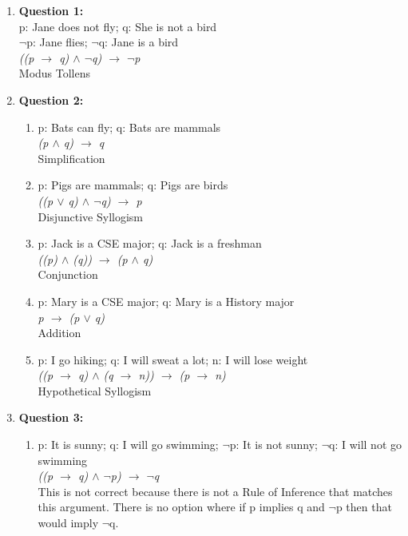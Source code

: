 \documentclass[11pt]{article}
\begin{document}
\begin{enumerate}
\item
\textbf{Question 1:} %
\\
p: Jane does not fly; q: She is not a bird \\
$\lnot$p: Jane flies; $\lnot$q: Jane is a bird  \\
\textit {
((p $\to$ q) $\land$ $\lnot$q) $\to$ $\lnot$p \\
}
Modus Tollens

\item
\textbf{Question 2:} %
\begin{enumerate}[label=(\alph*)]
\item %
p: Bats can fly; q: Bats are mammals \\
\textit {
(p $\land$ q) $\to$ q
} \\
Simplification

\item %
p: Pigs are mammals; q: Pigs are birds \\
\textit {
((p $\lor$ q) $\land$ $\lnot$q) $\to$ p
} \\
Disjunctive Syllogism

\item %
p: Jack is a CSE major; q: Jack is a freshman \\
\textit {
((p) $\land$ (q)) $\to$ (p $\land$ q)
} \\
Conjunction

\item %
p: Mary is a CSE major; q: Mary is a History major\\
\textit {
p $\to$ (p $\lor$ q)
} \\
Addition

\item %
p: I go hiking; q: I will sweat a lot; n: I will lose weight \\
\textit {
((p $\to$ q) $\land$ (q $\to$ n)) $\to$ (p $\to$ n)
} \\
Hypothetical Syllogism
\end{enumerate}

\item
\textbf {Question 3: } %
\begin {enumerate} [label = (\alph*)]
\item %
p: It is sunny; q: I will go swimming; $\lnot$p: It is not sunny; $\lnot$q: I will not go swimming \\
\textit {
((p $\to$ q) $\land$ $\lnot$p) $\to$ $\lnot$q
} \\
This is not correct because there is not a Rule of Inference that matches this argument. There is no option where if p implies q and $\lnot$p then that would imply $\lnot$q.


\end{enumerate}
\end{enumerate}
\end{document}
